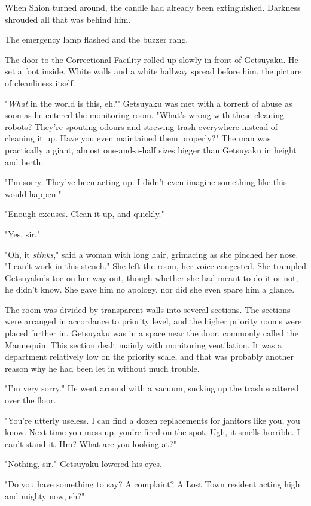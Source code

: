 When Shion turned around, the candle had already been extinguished.
Darkness shrouded all that was behind him.

\mybreak

The emergency lamp flashed and the buzzer rang.

The door to the Correctional Facility rolled up slowly in front of
Getsuyaku. He set a foot inside. White walls and a white hallway spread
before him, the picture of cleanliness itself.

"\emph{What} in the world is this, eh?" Getsuyaku was met with a torrent of
abuse as soon as he entered the monitoring room. "What's wrong with
these cleaning robots? They're spouting odours and strewing trash
everywhere instead of cleaning it up. Have you even maintained them
properly?" The man was practically a giant, almost one-and-a-half sizes
bigger than Getsuyaku in height and berth.

"I'm sorry. They've been acting up. I didn't even imagine something like
this would happen."

"Enough excuses. Clean it up, and quickly."

"Yes, sir."

"Oh, it \emph{stinks}," said a woman with long hair, grimacing as she pinched
her nose. "I can't work in this stench." She left the room, her voice
congested. She trampled Getsuyaku's toe on her way out, though whether
she had meant to do it or not, he didn't know. She gave him no apology,
nor did she even spare him a glance.

The room was divided by transparent walls into several sections. The
sections were arranged in accordance to priority level, and the higher
priority rooms were placed further in. Getsuyaku was in a space near the
door, commonly called the Mannequin. This section dealt mainly with
monitoring ventilation. It was a department relatively low on the
priority scale, and that was probably another reason why he had been let
in without much trouble.

"I'm very sorry." He went around with a vacuum, sucking up the trash
scattered over the floor.

"You're utterly useless. I can find a dozen replacements for janitors
like you, you know. Next time you mess up, you're fired on the spot.
Ugh, it smells horrible. I can't stand it. Hm? What are you looking at?"

"Nothing, sir." Getsuyaku lowered his eyes.

"Do you have something to say? A complaint? A Lost Town resident acting
high and mighty now, eh?"

